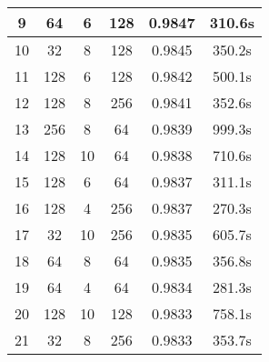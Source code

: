 \begin{table}[htbp]
\begin{center}
\begin{tabular}{|c|c|c|c|c|c|}
      \hline
      9             & 64                    & 6                       & 128                        & 0.9847                     & 310.6s                      \\
      \hline
      10            & 32                    & 8                       & 128                        & 0.9845                     & 350.2s                      \\
      \hline
      11            & 128                   & 6                       & 128                        & 0.9842                     & 500.1s                      \\
      \hline
      12            & 128                   & 8                       & 256                        & 0.9841                     & 352.6s                      \\
      \hline
      13            & 256                   & 8                       & 64                         & 0.9839                     & 999.3s                      \\
      \hline
      14            & 128                   & 10                      & 64                         & 0.9838                     & 710.6s                      \\
      \hline
      15            & 128                   & 6                       & 64                         & 0.9837                     & 311.1s                      \\
      \hline
      16            & 128                   & 4                       & 256                        & 0.9837                     & 270.3s                      \\
      \hline
      17            & 32                    & 10                      & 256                        & 0.9835                     & 605.7s                      \\
      \hline
      18            & 64                    & 8                       & 64                         & 0.9835                     & 356.8s                      \\
      \hline
      19            & 64                    & 4                       & 64                         & 0.9834                     & 281.3s                      \\
      \hline
      20            & 128                   & 10                      & 128                        & 0.9833                     & 758.1s                      \\
      \hline
      21            & 32                    & 8                       & 256                        & 0.9833                     & 353.7s                      \\

\end{tabular}
\end{center}
\end{table}
